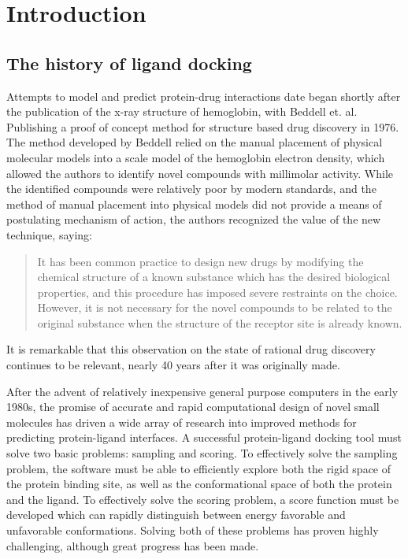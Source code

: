 \chapter{Introduction}

\section{The history of ligand docking}
Attempts to model and predict protein-drug interactions date began shortly after the publication of the x-ray structure of hemoglobin, with Beddell et. al. Publishing a proof of concept method for structure based drug discovery in 1976\citep{BEDDELL:1976go}.
The method developed by Beddell relied on the manual placement of physical molecular models into a scale model of the hemoglobin electron density, which allowed the authors to identify novel compounds with millimolar activity. 
While the identified compounds were relatively poor by modern standards, and the method of manual placement into physical models did not provide a means of postulating mechanism of action, the authors recognized the value of the new technique, saying:
\begin{quote}
It has been common practice to design new drugs by modifying the chemical structure of a known substance which has the desired biological properties, and this procedure has imposed severe restraints on the choice.
However, it is not necessary for the novel compounds to be related to the original substance when the structure of the receptor site is already known. 
\end{quote}
It is remarkable that this observation on the state of rational drug discovery continues to be relevant, nearly 40 years after it was originally made. 

After the advent of relatively inexpensive general purpose computers in the early 1980s, the promise of accurate and rapid computational design of novel small molecules has driven a wide array of research into improved methods for predicting protein-ligand interfaces.
A successful protein-ligand docking tool must solve two basic problems: sampling and scoring.
To effectively solve the sampling problem, the software must be able to efficiently explore both the rigid space of the protein binding site, as well as the conformational space of both 	the protein and the ligand.
To effectively solve the scoring problem, a score function must be developed which can rapidly distinguish between energy favorable and unfavorable conformations.
Solving both of these problems has proven highly challenging, although great progress has been made. 

